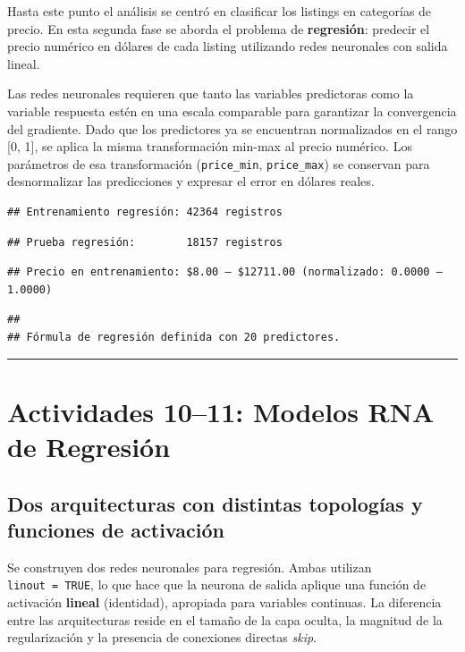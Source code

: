 \documentclass[
]{article}
\begin{document}
Hasta este punto el análisis se centró en clasificar los listings en
categorías de precio. En esta segunda fase se aborda el problema de
\textbf{regresión}: predecir el precio numérico en dólares de cada
listing utilizando redes neuronales con salida lineal.

Las redes neuronales requieren que tanto las variables predictoras como
la variable respuesta estén en una escala comparable para garantizar la
convergencia del gradiente. Dado que los predictores ya se encuentran
normalizados en el rango {[}0, 1{]}, se aplica la misma transformación
min-max al precio numérico. Los parámetros de esa transformación
(\texttt{price\_min}, \texttt{price\_max}) se conservan para
desnormalizar las predicciones y expresar el error en dólares reales.

\begin{verbatim}
## Entrenamiento regresión: 42364 registros
\end{verbatim}

\begin{verbatim}
## Prueba regresión:        18157 registros
\end{verbatim}

\begin{verbatim}
## Precio en entrenamiento: $8.00 – $12711.00 (normalizado: 0.0000 – 1.0000)
\end{verbatim}

\begin{verbatim}
## 
## Fórmula de regresión definida con 20 predictores.
\end{verbatim}

\begin{center}\rule{0.5\linewidth}{0.5pt}\end{center}

\section{Actividades 10--11: Modelos RNA de
Regresión}\label{actividades-1011-modelos-rna-de-regresiuxf3n}

\subsection{Dos arquitecturas con distintas topologías y funciones de
activación}\label{dos-arquitecturas-con-distintas-topologuxedas-y-funciones-de-activaciuxf3n}

Se construyen dos redes neuronales para regresión. Ambas utilizan
\texttt{linout\ =\ TRUE}, lo que hace que la neurona de salida aplique
una función de activación \textbf{lineal} (identidad), apropiada para
variables continuas. La diferencia entre las arquitecturas reside en el
tamaño de la capa oculta, la magnitud de la regularización y la
presencia de conexiones directas \emph{skip}.
\end{document}
